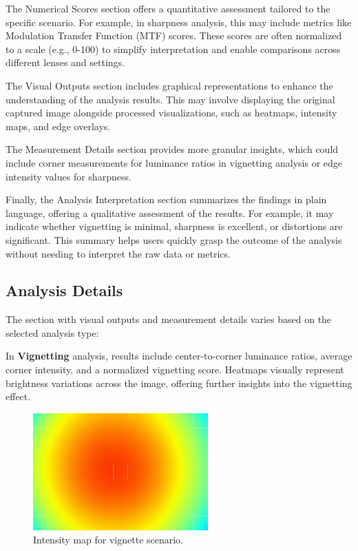 The Numerical Scores section offers a quantitative assessment tailored to the specific scenario. For example, in sharpness analysis, this may include metrics like Modulation Transfer Function (MTF) scores. These scores are often normalized to a scale (e.g., 0-100) to simplify interpretation and enable comparisons across different lenses and settings.

The Visual Outputs section includes graphical representations to enhance the understanding of the analysis results. This may involve displaying the original captured image alongside processed visualizations, such as heatmaps, intensity maps, and edge overlays.

The Measurement Details section provides more granular insights, which could include corner measurements for luminance ratios in vignetting analysis or edge intensity values for sharpness.

Finally, the Analysis Interpretation section summarizes the findings in plain language, offering a qualitative assessment of the results. For example, it may indicate whether vignetting is minimal, sharpness is excellent, or distortions are significant. This summary helps users quickly grasp the outcome of the analysis without needing to interpret the raw data or metrics.

\subsection{Analysis Details}

The section with visual outputs and measurement details varies based on the selected analysis type:

In \textbf{Vignetting} analysis, results include center-to-corner luminance ratios, average corner intensity, and a normalized vignetting score. Heatmaps visually represent brightness variations across the image, offering further insights into the vignetting effect.

\begin{figure}[hbt]
\centering
\includegraphics[width=0.6\textwidth]{Images/vignette_image_result.jpg}
\caption{Intensity map for vignette scenario.}
\label{fig:ui_vignette_intensity_map}
\end{figure}

